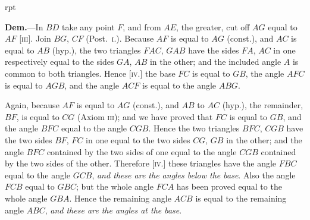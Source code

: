 \documentclass[oneside]{book}
\newcommand\imgflow[3]{
\setcounter{wrapwidth}{#1}
\begin{wrapfigure}[#2]{r}{\value{wrapwidth}pt}
\begin{center}
\vspace{-0.3in}
\end{center}
\end{wrapfigure}
}
\begin{document}
\imgflow{128}{12}{f016}

\textbf{Dem.}---In $BD$ take any point $F$, and from $AE$, the
greater, cut off $AG$ equal to
$AF$ [\textsc{iii}]. Join $BG$, $CF$
(Post.~\textsc{i.}). Because $AF$ is
equal to $AG$ (const.), and $AC$
is equal to $AB$ (hyp.), the
two triangles $FAC$, $GAB$
have the sides $FA$, $AC$ in
one respectively equal to the
sides $GA$, $AB$ in the other;
and the included angle $A$ is
common to both triangles.
Hence [\textsc{iv.}] the base $FC$ is
equal to $GB$, the angle $AFC$ is equal to $AGB$, and the
angle $ACF$ is equal to the angle $ABG$.

Again, because $AF$ is equal to $AG$ (const.), and $AB$
to $AC$ (hyp.), the remainder, $BF$, is equal to $CG$ (Axiom
\textsc{iii}); and we have proved that $FC$ is equal to $GB$, and
the angle $BFC$ equal to the angle $CGB$. Hence the
two triangles $BFC$, $CGB$ have the two sides $BF$, $FC$ in
one equal to the two sides $CG$, $GB$ in the other; and the
angle $BFC$ contained by the two sides of one equal to the
angle $CGB$ contained by the two sides of the other.
Therefore [\textsc{iv.}] these triangles have the angle $FBC$
equal to the angle $GCB$, \emph{and these are the angles below
the base}. Also the angle $FCB$ equal to $GBC$; but the
whole angle $FCA$ has been proved equal to the whole
angle $GBA$. Hence the remaining angle $ACB$ is equal
to the remaining angle $ABC$, \emph{and these are the angles
at the base}.
\end{document}
